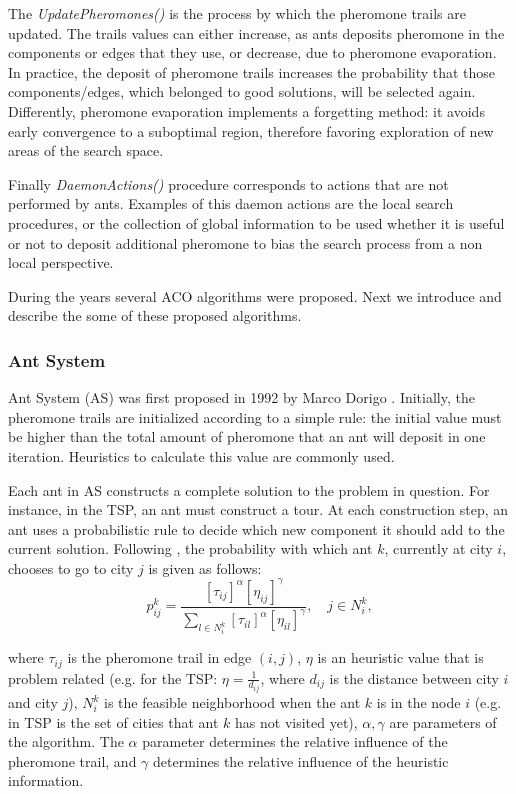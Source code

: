 				The \emph{UpdatePheromones()} is the process by which the pheromone trails are updated. The trails values can either increase, as ants deposits pheromone in the components or edges that they use, or decrease, due to pheromone evaporation. In practice, the deposit of pheromone trails increases the probability that those components/edges, which belonged to good solutions, will be selected again. Differently, pheromone evaporation implements a forgetting method: it avoids early convergence to a suboptimal region, therefore favoring exploration of new areas of the search space.
				 
				Finally \emph{DaemonActions()} procedure corresponds to actions that are not performed by ants. Examples of this daemon actions are the local search procedures, or the collection of global information to be used whether it is useful or not to deposit additional pheromone to bias the search process from a non local perspective.
				
				During the years several ACO algorithms were proposed. Next we introduce and describe the some of these proposed algorithms. 

					\subsubsection*{Ant System} 
					\label{sec:ant_system}
					Ant System (AS) was first proposed in 1992 by Marco Dorigo \cite{dorigo92, dorigo96}.
					Initially, the pheromone trails are initialized according to a simple rule: the initial value must be higher than the total amount of pheromone that an ant will deposit in one iteration. Heuristics to calculate this value are commonly used.

					Each ant in AS constructs a complete solution to the problem in question. For instance, in the TSP, an ant must construct a tour. At each construction step, an ant uses a probabilistic rule to decide which new component it should add to the current solution. Following \cite{dorigo96}, the probability with which ant $k$, currently at city $i$, chooses to go to city $j$ is given as follows:
					\begin{equation}
						\label{eq:prob_rule_for_choice}
						p_{ij}^k = \frac{[\tau_{ij}]^\alpha[\eta_{ij}]^\gamma} {\sum_{l \in N_{i}^k} [\tau_{il}]^\alpha[\eta_{il}]^\gamma}, \quad j \in N_{i}^k,
					\end{equation}

		\noindent where $\tau_{ij}$ is the pheromone trail in edge $(i,j)$, $\eta$ is an heuristic value that is problem related (e.g. for the TSP: $\eta = \frac{1}{d_{ij}}$, where $d_{ij}$ is the distance between city $i$ and city $j$), $N_i^k$ is the feasible neighborhood when the ant $k$ is in the node $i$ (e.g. in TSP is the set of cities that ant $k$ has not visited yet), $\alpha, \gamma$ are parameters of the algorithm. The $\alpha$ parameter determines the relative influence of the pheromone trail, and $\gamma$ determines the relative influence of the heuristic information.


